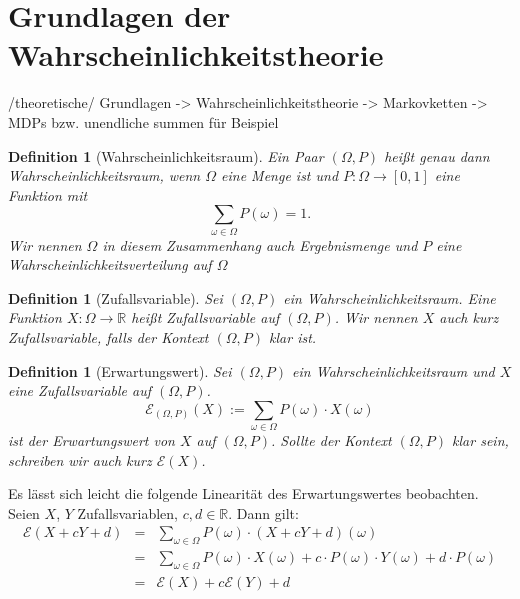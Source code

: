 \documentclass[a4paper]{article}
\newtheorem{definition}[satz]{Definition} %
\theoremstyle{nonumberplain}
\begin{document}
\section{Grundlagen der Wahrscheinlichkeitstheorie}

\begin{meta}
	/theoretische/ Grundlagen
	 -> Wahrscheinlichkeitstheorie
	 -> Markovketten
	 -> MDPs bzw. unendliche summen für Beispiel
\end{meta}

\newcommand{\probspace}{Wahr\-schein\-lich\-keits\-raum}
\newcommand{\probspaceexraw}{(\Omega, P)}
\newcommand{\probspaceex}{$(\Omega, P)$}
\begin{definition}[\probspace{}] \label{def-probspace}
	\hspace{1ex} Ein Paar \probspaceex{} heißt genau dann \probspace{}, wenn $\Omega$ eine Menge ist und $P : \Omega \to [0,1] $ eine Funktion mit
	\begin{equation}
		\sum_{\omega \in \Omega} P(\omega) = 1 \text{.}
	\end{equation} Wir nennen $\Omega$ in diesem Zusammenhang auch Ergebnismenge und $P$ eine Wahr\-schein\-lich\-keitsverteilung auf $\Omega$
\end{definition}
\newcommand{\rvar}{Zufallsvariable}
\begin{definition}[\rvar{}] \label{def-rvar}
	Sei \probspaceex{} ein \probspace{}. Eine Funktion $X : \Omega \to \mathbb{R}$ heißt \rvar{} auf \probspaceex{}. Wir nennen $X$ auch kurz \rvar{}, falls der Kontext \probspaceex{} klar ist.
\end{definition}
\newcommand{\expect}{Erwartungswert}
\begin{definition}[\expect{}] \label{def-expect}
	\hspace{1ex} Sei \probspaceex{} ein \probspace{} und $X$ eine \rvar{} auf \probspaceex{}.
	\begin{equation}
		\mathcal{E}_{\probspaceexraw{}}(X) := \sum_{\omega \in \Omega}{P(\omega) \cdot X(\omega)}
	\end{equation}
	ist der \expect{} von $X$ auf \probspaceex{}. Sollte der Kontext \probspaceex{} klar sein, schreiben wir auch kurz $\mathcal{E}(X)$.
\end{definition}
Es lässt sich leicht die folgende Linearität des \expect{}es beobachten. Seien $X$, $Y$ Zufallsvariablen, $c,d \in \mathbb{R}$. Dann gilt:
\begin{align}
	\mathcal{E}(X + cY + d) & = & \sum_{\omega \in \Omega}{P(\omega) \cdot (X + cY + d)(\omega) } \nonumber \\
	& = & \sum_{\omega \in \Omega}{P(\omega) \cdot X(\omega) + c \cdot P(\omega) \cdot Y(\omega) + d \cdot P(\omega)} \nonumber \\
	& = & \mathcal{E}(X) + c \mathcal{E}(Y) + d \label{eq-linearity}
\end{align}
\end{document}
